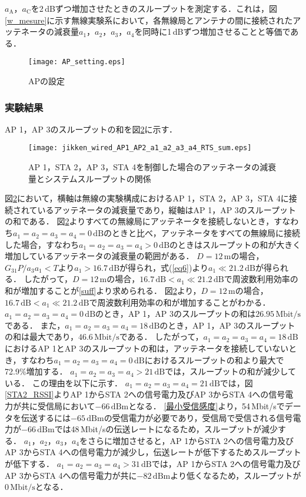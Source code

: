 \documentclass[master]{kuisthesis}		%
\begin{document}
$a_\mathrm{A}$，$a_\mathrm{C}$を2\,dBずつ増加させたときのスループットを測定する．これは，図\ref{w_mesure}に示す無線実験系において，各無線局とアンテナの間に接続されたアッテネータの減衰量$a_1$，$a_2$，$a_3$，$a_4$を同時に1\,dBずつ増加させることと等価である．
\ifnum {}
\begin{figure}[!t]
\centering
\texttt{[image: AP\_setting.eps]}
\caption{APの設定}
\label{AP_setting}
\end{figure}
\fi

\subsubsection{実験結果}
AP 1，AP 3のスループットの和を図\ref{throughput_RTS_sum}に示す．
\ifnum {}
\begin{figure}[!t]
\centering
\texttt{[image: jikken\_wired\_AP1\_AP2\_a1\_a2\_a3\_a4\_RTS\_sum.eps]}
\caption{AP 1，STA 2，AP 3，STA 4を制御した場合のアッテネータの減衰量とシステムスループットの関係}
\label{throughput_RTS_sum}
\end{figure}
\fi
図\ref{throughput_RTS_sum}において，横軸は無線の実験構成におけるAP 1，STA 2，AP 3，STA 4に接続されているアッテネータの減衰量であり，縦軸はAP 1，AP 3のスループットの和である．
図\ref{throughput_RTS_sum}よりすべての無線局にアッテネータを接続しないとき，すなわち$a_1=a_2=a_3=a_4=0\,\mathrm{dB}$のときと比べ，アッテネータをすべての無線局に接続した場合，すなわち$a_1 = a_2 = a_3 = a_4 > 0\,\mathrm{dB}$のときはスループットの和が大きく増加しているアッテネータの減衰量の範囲がある．
$D=12\,\mathrm{m}$の場合，$G_{31}P/a_3a_1<T$より$a_1>16.7\,\mathrm{dB}$が得られ，式(\ref{eq6})より$a_1 \ll 21.2\,\mathrm{dB}$が得られる．
したがって，$D=12\,\mathrm{m}$の場合，$16.7\,\mathrm{dB} < a_1 \ll 21.2\,\mathrm{dB}$で周波数利用効率の和が増加することが\ref{suff}より求められる．
図\ref{throughput_RTS_sum}より，$D=12\,\mathrm{m}$の場合，$16.7\,\mathrm{dB} < a_1 \ll 21.2\,\mathrm{dB}$で周波数利用効率の和が増加することがわかる．
$a_1=a_2=a_3=a_4=0\,\mathrm{dB}$のとき，AP 1，AP 3のスループットの和は$26.95\,\mathrm{Mbit/s}$である．
また，$a_1=a_2=a_3=a_4=18\,\mathrm{dB}$のとき，AP 1，AP 3のスループットの和は最大であり，$46.6\,\mathrm{Mbit/s}$である．
したがって，$a_1 = a_2 = a_3 = a_4 = 18\,\mathrm{dB}$におけるAP 1とAP 3のスループットの和は，アッテネータを接続していないとき，すなわち$a_1 = a_2 = a_3 = a_4 = 0\,\mathrm{dB}$におけるスループットの和より最大で72.9\%増加する．
$a_1 = a_2 = a_3 = a_4 > 21\,\mathrm{dB}$では，スループットの和が減少している．
この理由を以下に示す．
$a_1 = a_2 = a_3 = a_4 = 21\,\mathrm{dB}$では，図\ref{STA2_RSSI}よりAP 1からSTA 2への信号電力及びAP 3からSTA 4への信号電力が共に受信局において$-66\,\mathrm{dBm}$となる．
\ref{最小受信感度}より，54\,Mbit/sでデータを伝送するには$-65\,\mathrm{dBm}$の受信電力が必要であり，受信局で受信される信号電力が$-66\,\mathrm{dBm}$では48\,Mbit/sの伝送レートになるため，スループットが減少する．
$a_1$，$a_2$，$a_3$，$a_4$をさらに増加させると，AP 1からSTA 2への信号電力及びAP 3からSTA 4への信号電力が減少し，伝送レートが低下するためスループットが低下する．
$a_1 = a_2 = a_3 = a_4 > 31\,\mathrm{dB}$では，AP 1からSTA 2への信号電力及びAP 3からSTA 4への信号電力が共に$-82\,\mathrm{dBm}$より低くなるため，スループットが$0\,\mathrm{Mbit/s}$となる．
\end{document}
